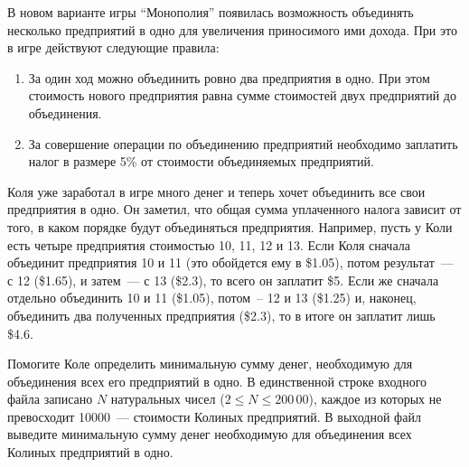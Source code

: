 В новом варианте игры ``Монополия'' появилась возможность
объединять несколько предприятий в одно для увеличения 
приносимого ими дохода. При это в игре действуют следующие правила:

\begin{enumerate}
\item За один ход можно объединить ровно два предприятия в одно.
При этом стоимость нового предприятия равна сумме стоимостей
двух предприятий до объединения.
\item За совершение операции по объединению предприятий необходимо
заплатить налог в размере 5\% от стоимости объединяемых предприятий.
\end{enumerate}

Коля уже заработал в игре много денег и теперь хочет объединить все свои
предприятия в одно. Он заметил, что общая сумма уплаченного налога
зависит от того, в каком порядке будут объединяться предприятия.
Например, пусть у Коли есть четыре предприятия стоимостью 10, 11, 12 и 13.
Если Коля сначала объединит предприятия 10 и 11
(это обойдется ему в \$1.05), потом результат~--- с 12 (\$1.65), и затем~---
с 13 (\$2.3), то всего он заплатит \$5.
Если же сначала отдельно объединить 10 и 11 (\$1.05), потом~-- 12 и 13
(\$1.25) и, наконец, объединить два полученных предприятия
(\$2.3), то в итоге он заплатит лишь \$4.6.

Помогите Коле определить минимальную сумму денег, необходимую
для объединения всех его предприятий в одно.
\InputFile
В единственной строке входного файла записано
$N$ натуральных чисел ($2 \leq N \leq 200\,00$),
каждое из которых не превосходит 10000~---
стоимости Колиных предприятий.
\OutputFile
В выходной файл выведите минимальную сумму денег
необходимую для объединения всех Колиных предприятий в одно.
